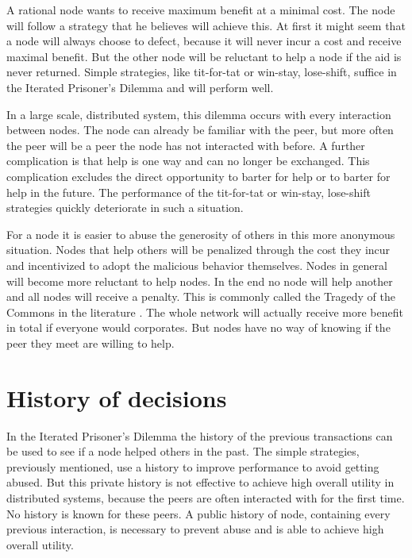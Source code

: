 A rational node wants to receive maximum benefit at a minimal cost.
The node will follow a strategy that he believes will achieve this.
At first it might seem that a node will always choose to defect,
because it will never incur a cost and receive maximal benefit.
But the other node will be reluctant to help a node if the aid is never returned.
Simple strategies, like tit-for-tat or win-stay, lose-shift, suffice in the Iterated Prisoner's Dilemma
and will perform well\cite{Nowak-Cooperation}.

In a large scale, distributed system, this dilemma occurs with every interaction between nodes.
The node can already be familiar with the peer,
but more often the peer will be a peer the node has not interacted with before.
A further complication is that help is one way and can no longer be exchanged.
This complication excludes the direct opportunity to barter for help 
or to barter for help in the future\cite{Lai-Incentives}.
The performance of the tit-for-tat or win-stay, lose-shift strategies
quickly deteriorate in such a situation.

For a node it is easier to abuse the generosity of others in this more anonymous situation.
Nodes that help others will be penalized through the cost they incur
and incentivized to adopt the malicious behavior themselves.
Nodes in general will become more reluctant to help nodes\cite{Nowak-PrisonerDilemma}.
In the end no node will help another and all nodes will receive a penalty.
This is commonly called the Tragedy of the Commons in the literature \cite{hardin-tragedy}.
The whole network will actually receive more benefit in total if everyone would corporates.
But nodes have no way of knowing if the peer they meet are willing to help.

\section{History of decisions}

In the Iterated Prisoner's Dilemma the history of the previous transactions can be used 
to see if a node helped others in the past.
The simple strategies, previously mentioned, use a history to improve performance
to avoid getting abused.
But this private history is not effective to achieve high overall utility in distributed systems,
because the peers are often interacted with for the first time.
No history is known for these peers.
A public history of node, containing every previous interaction, is necessary to prevent abuse
and is able to achieve high overall utility\cite{Lai-Incentives}.

